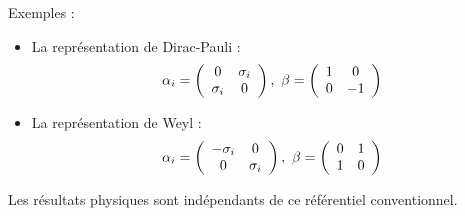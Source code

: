 Exemples :
\begin{itemize}[leftmargin=1cm,  itemsep=1pt]
\item La représentation de Dirac-Pauli : \[\alpha_i=\left(\begin{array}{cc}
0&\s_i\\\s_i&0\\\end{array}\right),\ \beta=\left(\begin{array}{cc}
1&0\\0&-1\\\end{array}\right)\]
\item La représentation de Weyl : \[\alpha_i=\left(\begin{array}{cc}
-\s_i&0\\0&\s_i\\\end{array}\right),\ \beta=\left(\begin{array}{cc}
0&1\\1&0\\\end{array}\right)\]
\end{itemize}
Les résultats physiques sont indépendants de ce référentiel conventionnel.
